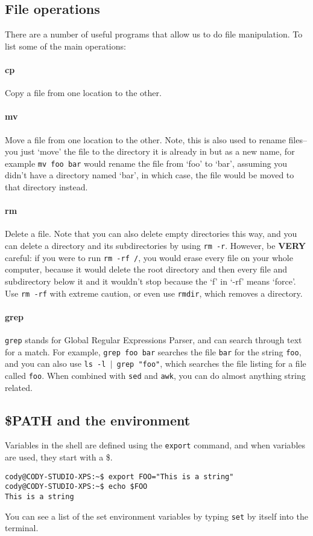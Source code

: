 \documentclass{article}
\begin{document}
\subsection{File operations}
There are a number of useful programs that allow us to do file manipulation. To list some of the main operations:
\paragraph{cp} 
Copy a file from one location to the other.
\paragraph{mv}
Move a file from one location to the other. Note, this is also used to rename files--you just `move' the file to the directory it is already in but as a new name, for example \texttt{mv foo bar} would rename the file from `foo' to `bar', assuming you didn't have a directory named `bar', in which case, the file would be moved to that directory instead.
\paragraph{rm}
Delete a file. Note that you can also delete empty directories this way, and you can delete a directory and its subdirectories by using \texttt{rm -r}. However, be \textbf{VERY} careful: if you were to run \texttt{rm -rf /}, you would erase every file on your whole computer, because it would delete the root directory and then every file and subdirectory below it and it wouldn't stop because the `f' in `-rf' means `force'. Use \texttt{rm -rf} with extreme caution, or even use \texttt{rmdir}, which removes a directory.
\paragraph{grep}
\texttt{grep} stands for Global Regular Expressions Parser, and can search through text for a match. For example, \texttt{grep foo bar} searches the file \texttt{bar} for the string \texttt{foo}, and you can also use \texttt{ls -l $|$ grep "foo"}, which searches the file listing for a file called \texttt{foo}. When combined with \texttt{sed} and \texttt{awk}, you can do almost anything string related.

\subsection{\$PATH and the environment}
Variables in the shell are defined using the \texttt{export} command, and when variables are used, they start with a \$.
\begin{verbatim}
cody@CODY-STUDIO-XPS:~$ export FOO="This is a string"
cody@CODY-STUDIO-XPS:~$ echo $FOO
This is a string
\end{verbatim} 
You can see a list of the set environment variables by typing \texttt{set} by itself into the terminal.
\end{document}
